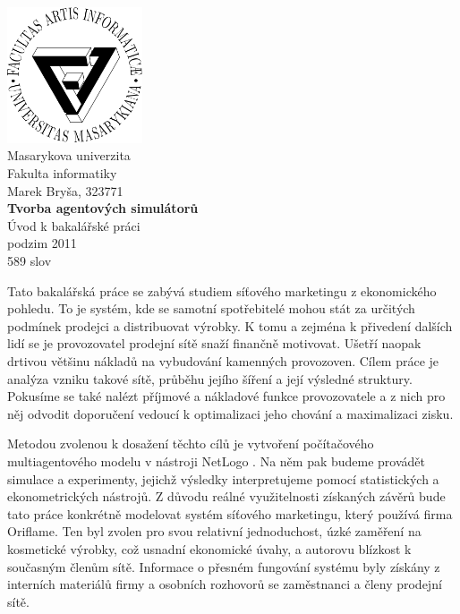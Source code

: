 \documentclass[a4paper,11pt]{report}
\begin{document}
\thispagestyle{empty}
\pagebreak
\mbox{}%
\\[2cm]
\begin{center}
\includegraphics[width=0.3\textwidth]{./filogo.pdf}\\[1cm]    

{\large Masarykova univerzita}\\[0.5cm]
{\large Fakulta informatiky}\\[0.5cm]
{\large Marek Bryša, 323771}\\[0.5cm]
{ \huge \bfseries Tvorba agentových simulátorů}\\[0.4cm]
{\large Úvod k bakalářské práci}\\[0.7cm]
\vfill
{\large podzim 2011}\\
{\large 589 slov}\\



\pagebreak

\end{center}

Tato bakalářská práce se zabývá studiem síťového marketingu z ekonomického pohledu. To je systém, kde se samotní spotřebitelé mohou stát za určitých podmínek prodejci a distribuovat výrobky. K tomu a zejména k přivedení dalších lidí se je provozovatel prodejní sítě snaží finančně motivovat. Ušetří naopak drtivou většinu nákladů na vybudování kamenných provozoven. Cílem práce je analýza vzniku takové sítě, průběhu jejího šíření a její výsledné struktury. Pokusíme se také nalézt příjmové a nákladové funkce provozovatele a z nich pro něj odvodit doporučení vedoucí k optimalizaci jeho chování a maximalizaci zisku.

Metodou zvolenou k dosažení těchto cílů je vytvoření počítačového multiagentového modelu \cite{gilbert} v nástroji NetLogo \cite{netlogo}. Na něm pak budeme provádět simulace a experimenty, jejichž výsledky interpretujeme pomocí statistických a ekonometrických nástrojů. Z důvodu reálné využitelnosti získaných závěrů bude tato práce konkrétně modelovat systém síťového marketingu, který používá firma Oriflame. Ten byl zvolen pro svou relativní jednoduchost, úzké zaměření na kosmetické výrobky, což usnadní ekonomické úvahy, a autorovu blízkost k současným členům sítě. Informace o přesném fungování systému byly získány z interních materiálů firmy \cite{oriflame} a osobních rozhovorů se zaměstnanci a členy prodejní sítě.
\end{document}
